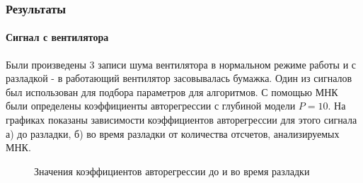 \documentclass[9pt]{beamer}
\begin{document}
\begin{frame}\frametitle{Результаты}
\framesubtitle{Сигнал с вентилятора}
Были произведены 3 записи шума вентилятора в нормальном режиме работы и с разладкой - в работающий вентилятор засовывалась бумажка. Один из сигналов был использован для подбора параметров для алгоритмов. С помощью МНК были определены коэффициенты авторегрессии с глубиной модели $P = 10$. На графиках показаны зависимости коэффициентов авторегрессии для этого сигнала а) до разладки, б) во время разладки от количества отсчетов, анализируемых МНК.
\begin{figure}[h]
\begin{minipage}[h]{0.49\linewidth}
\end{minipage}
\begin{minipage}[h]{0.49\linewidth}
\end{minipage}
\caption{Значения коэффициентов авторегрессии до и во время разладки}
\end{figure}
\end{frame}
\end{document}
